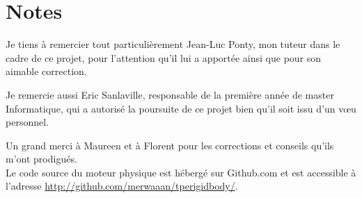 \section*{Notes}

Je tiens à remercier tout particulièrement Jean-Luc Ponty, mon tuteur
dans le cadre de ce projet, pour l'attention qu'il lui a apportée
ainsi que pour son aimable correction.

Je remercie aussi Eric Sanlaville, responsable de la première année de
master Informatique, qui a autorisé la poursuite de ce projet bien
qu'il soit issu d'un v\oe u personnel.

Un grand merci à Maureen et à Florent pour les corrections et conseils
qu'ils m'ont prodigués. \\

Le code source du moteur physique est hébergé sur Github.com et est
accessible à l'adresse \url{http://github.com/merwaaan/tperigidbody/}.
